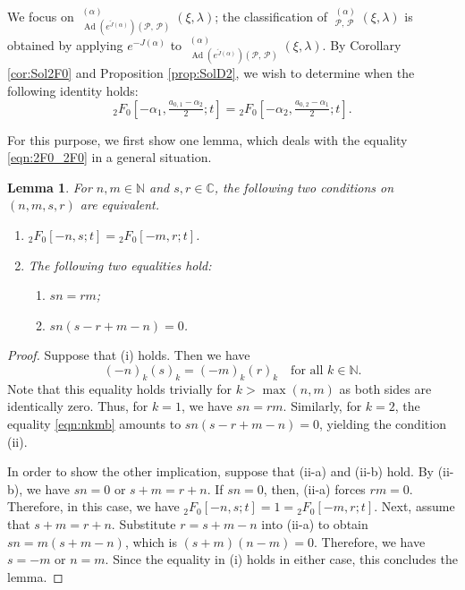 \documentclass[a4paper,11pt,reqno]{amsart}
\newcommand{\calP}{\mathcal{P}}
\newcommand{\0}{{\bf 0}}
\newcommand{\N}{\mathbb{N}}
\newcommand{\C}{\mathbb{C}}
\newcommand{\1}{{\bf 1}}
\DeclareMathOperator{\Ad}{Ad}
\DeclareMathOperator{\Sol}{Sol}
\newcommand{\wJ}{\widetilde{J}}
\DeclareMathOperator{\wSol}{\widetilde{\Sol}}
\theoremstyle{plain}
\newtheorem{lemma}[equation]{Lemma}
\theoremstyle{definition}
\numberwithin{equation}{section}
\theoremstyle{definition}
\begin{document}
We focus on $\wSol_{\Ad(e^{\wJ(\alpha)})(\calP,\, \calP)}^{(\alpha)}(\xi,\lambda)$;
the classification of $\wSol_{\calP,\, \calP}^{(\alpha)}(\xi,\lambda)$
is obtained by applying $e^{-J(\alpha)}$ to $\wSol_{\Ad(e^{\wJ(\alpha)})(\calP,\, \calP)}^{(\alpha)}(\xi,\lambda)$. 
By Corollary \ref{cor:Sol2F0} and Proposition \ref{prop:SolD2},
we wish to determine when the following identity holds:
\begin{equation}\label{eqn:2F0_2F0}
{}_2F_0[-\alpha_1, \tfrac{a_{0,1}-\alpha_2}{2};t]
=
{}_2F_0[-\alpha_2, \tfrac{a_{0,2}-\alpha_1}{2};t].
\end{equation}

For this purpose, we first show one lemma, which deals with
the equality \eqref{eqn:2F0_2F0} in a general situation.

\begin{lemma}\label{lem:FF}
For $n, m \in \N$ and $s, r \in \C$, the following two conditions 
on $(n,m, s,r)$ are equivalent.
\begin{enumerate}[label = \normalfont{(\roman*)}]
\item ${}_2F_0[-n,s;t] = {}_2F_0[-m,r;t]$.
\item The following two equalities hold:
\begin{enumerate}
\item[\textnormal{(ii-a)}] $sn=rm$;
\item[\textnormal{(ii-b)}] $sn(s-r+m-n)=0$.
\end{enumerate}
\end{enumerate}
\end{lemma}

\begin{proof}
Suppose that (i) holds. Then we have
\begin{equation}\label{eqn:nkmb}
(-n)_k(s)_k = (-m)_k(r)_k
\quad
\text{for all $k \in \N$}.
\end{equation}
Note that this equality holds trivially for $k>\max(n,m)$ as both sides are identically zero.
Thus, for $k=1$, we have $sn = rm$.
Similarly, for $k=2$, the equality \eqref{eqn:nkmb} amounts to
$sn(s-r+m-n)=0$, yielding the condition (ii).

In order to show the other implication, suppose that 
(ii-a) and (ii-b) hold. By (ii-b), we have $sn=0$ or $s+m=r+n$.
If $sn=0$, then, (ii-a) forces $rm=0$. Therefore, in this case, we have 
${}_2F_0[-n,s;t] =1 = {}_2F_0[-m,r;t]$. Next, assume that $s+m=r+n$.
Substitute $r=s+m-n$ into (ii-a) to obtain $sn= m(s+m-n)$, which is 
$(s+m)(n-m)=0$. Therefore, we have $s=-m$ or $n=m$.
Since the equality in (i) holds in either case, this concludes the lemma.
\end{proof}
\end{document}
